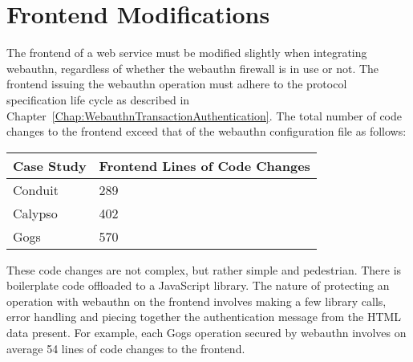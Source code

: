 


\section{Frontend Modifications}

The frontend of a web service must be modified slightly when integrating webauthn, regardless of whether the webauthn firewall is in use or not. The frontend issuing the webauthn operation must adhere to the protocol specification life cycle as described in Chapter~\ref{Chap:WebauthnTransactionAuthentication}. The total number of code changes to the frontend exceed that of the webauthn configuration file as follows:

\begin{table}[h]
\centering

\begin{tabular}{ m{4.5cm} m{6cm}  } 
 \hline
 Case Study & Frontend Lines of Code Changes \\ 
 \hline \hline

 Conduit & 289 \\ \hline

 Calypso & 402 \\ \hline

 Gogs & 570 \\ \hline

\end{tabular}
\end{table}

These code changes are not complex, but rather simple and pedestrian. There is boilerplate code offloaded to a JavaScript library. The nature of protecting an operation with webauthn on the frontend involves making a few library calls, error handling and piecing together the authentication message from the HTML data present. For example, each Gogs operation secured by webauthn involves on average 54 lines of code changes to the frontend. 



